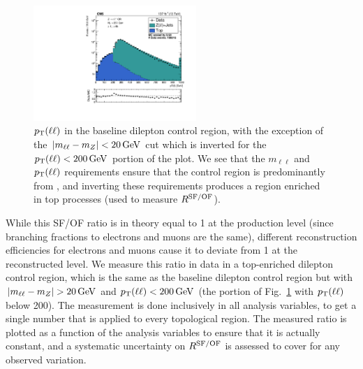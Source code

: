 \begin{figure}[ht]
  \begin{center}
    \includegraphics[width=0.55\textwidth]{figs/zinv/crdybase_zllpt.pdf}
    \caption{$p_{\mathrm{T}}(\ell\ell)$ in the baseline dilepton control region, with the exception
      of the $|m_{\ell\ell}-m_Z|<20\,\text{Ge\hspace{-.08em}V}$ cut which is inverted for the $p_{\mathrm{T}}(\ell\ell)<200\,\text{Ge\hspace{-.08em}V}$
      portion of the plot. We see that the $m_{\ell\ell}$ and $p_{\mathrm{T}}(\ell\ell)$ requirements ensure
      that the control region is predominantly from \zll, and inverting these requirements produces
      a region enriched in top processes (used to measure $R^{\mathrm{SF/OF}}$).
            }
    \label{fig:zllpt}
  \end{center}
\end{figure}

While this SF/OF ratio is in theory equal to 1 at the production level (since branching fractions to electrons
and muons are the same), different reconstruction efficiencies for electrons and muons cause it to deviate 
from 1 at the reconstructed level. We measure this ratio in data in a top-enriched dilepton control region,
which is the same as the baseline dilepton control region but with $|m_{\ell\ell}-m_Z|>20\GeV$ and
$p_{\mathrm{T}}(\ell\ell)<200\,\text{Ge\hspace{-.08em}V}$ (the portion of Fig.~\ref{fig:zllpt} with $p_{\mathrm{T}}(\ell\ell)$ below 200\GeV).
The measurement is done inclusively in all analysis variables, to get a single number that is applied 
to every topological region. The measured ratio is plotted as a function of the analysis variables to
ensure that it is actually constant, and a systematic uncertainty on $R^{\mathrm{SF/OF}}$ is assessed to
cover for any observed variation.

